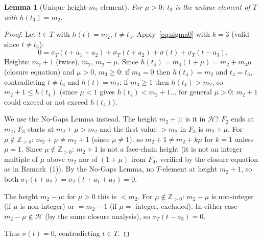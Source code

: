 \documentclass{article}
\newtheorem{lemma}{Lemma}
\begin{document}
\begin{lemma}[Unique height-$m_2$ element]\label{lem:top}
For $\mu>0$: $t_3$ is the unique element of $T$ with $h(t_3)=m_2$.
\end{lemma}
\begin{proof}
Let $t\in T$ with $h(t)=m_2$, $t\ne t_3$.  Apply~\eqref{eq:sigma0} with $k=3$
(valid since $t\ne t_3$):
\[
  0=\sigma_T(t+a_1+a_2)+\sigma_T(t+a_2)+\sigma(t)+\sigma_T(t-a_3).
\]
Heights: $m_2+1$ (twice), $m_2$, $m_2-\mu$.
Since $h(t_4)=m_4(1+\mu)=m_2+m_3\mu$ (closure equation) and $\mu>0$, $m_3\ge 0$:
if $m_3=0$ then $h(t_4)=m_2$ and $t_4=t_3$, contradicting $t\ne t_3$ and $h(t)=m_2$;
if $m_3\ge 1$ then $h(t_4)>m_2$, so $m_2+1\le h(t_4)$ (since $\mu<1$ gives $h(t_4)<m_2+1$...
for general $\mu>0$: $m_2+1$ could exceed or not exceed $h(t_4)$).

We use the No-Gaps Lemma instead.  The height $m_2+1$: is it in $\mathcal{H}$?
$F_2$ ends at $m_2$; $F_3$ starts at $m_2+\mu>m_2$ and the first value $>m_2$ in $F_3$ is $m_2+\mu$.
For $\mu\notin\mathbb{Z}_{>0}$: $m_2+\mu\ne m_2+1$ (since $\mu\ne 1$), so $m_2+1\ne m_2+k\mu$
for $k=1$ unless $\mu=1$.  Since $\mu\notin\mathbb{Z}_{>0}$: $m_2+1$ is not a face-chain height
(it is not an integer multiple of $\mu$ above $m_2$ nor of $(1+\mu)$ from $F_4$,
verified by the closure equation as in Remark~(1)).
By the No-Gaps Lemma, no $T$-element at height $m_2+1$, so both
$\sigma_T(t+a_2)=\sigma_T(t+a_1+a_2)=0$.

The height $m_2-\mu$: for $\mu>0$ this is $<m_2$.  For $\mu\notin\mathbb{Z}_{>0}$:
$m_2-\mu$ is non-integer (if $\mu$ is non-integer) or $=m_2-1$ (if $\mu=$ integer,
excluded).  In either case $m_2-\mu\notin\mathcal{H}$ (by the same closure analysis),
so $\sigma_T(t-a_3)=0$.

Thus $\sigma(t)=0$, contradicting $t\in T$.
\end{proof}
\end{document}
